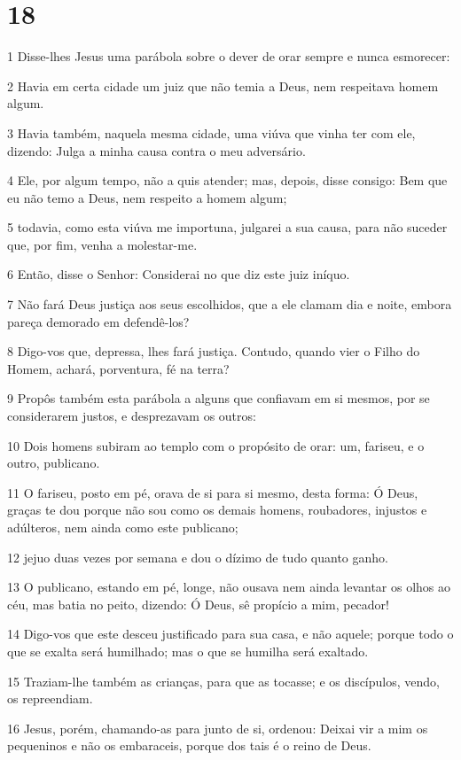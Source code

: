 \chapter{18}

\par 1 Disse-lhes Jesus uma parábola sobre o dever de orar sempre e nunca esmorecer:
\par 2 Havia em certa cidade um juiz que não temia a Deus, nem respeitava homem algum.
\par 3 Havia também, naquela mesma cidade, uma viúva que vinha ter com ele, dizendo: Julga a minha causa contra o meu adversário.
\par 4 Ele, por algum tempo, não a quis atender; mas, depois, disse consigo: Bem que eu não temo a Deus, nem respeito a homem algum;
\par 5 todavia, como esta viúva me importuna, julgarei a sua causa, para não suceder que, por fim, venha a molestar-me.
\par 6 Então, disse o Senhor: Considerai no que diz este juiz iníquo.
\par 7 Não fará Deus justiça aos seus escolhidos, que a ele clamam dia e noite, embora pareça demorado em defendê-los?
\par 8 Digo-vos que, depressa, lhes fará justiça. Contudo, quando vier o Filho do Homem, achará, porventura, fé na terra?
\par 9 Propôs também esta parábola a alguns que confiavam em si mesmos, por se considerarem justos, e desprezavam os outros:
\par 10 Dois homens subiram ao templo com o propósito de orar: um, fariseu, e o outro, publicano.
\par 11 O fariseu, posto em pé, orava de si para si mesmo, desta forma: Ó Deus, graças te dou porque não sou como os demais homens, roubadores, injustos e adúlteros, nem ainda como este publicano;
\par 12 jejuo duas vezes por semana e dou o dízimo de tudo quanto ganho.
\par 13 O publicano, estando em pé, longe, não ousava nem ainda levantar os olhos ao céu, mas batia no peito, dizendo: Ó Deus, sê propício a mim, pecador!
\par 14 Digo-vos que este desceu justificado para sua casa, e não aquele; porque todo o que se exalta será humilhado; mas o que se humilha será exaltado.
\par 15 Traziam-lhe também as crianças, para que as tocasse; e os discípulos, vendo, os repreendiam.
\par 16 Jesus, porém, chamando-as para junto de si, ordenou: Deixai vir a mim os pequeninos e não os embaraceis, porque dos tais é o reino de Deus.

